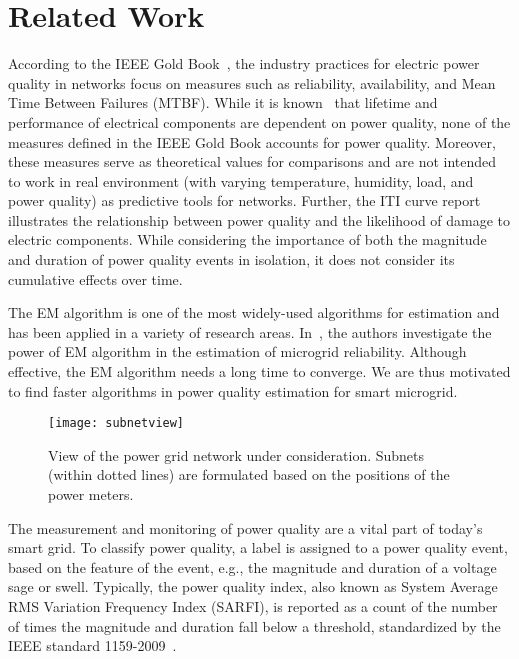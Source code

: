 \section{Related Work}
According to the IEEE Gold Book~\cite{goldbook}, the industry practices for electric power quality in networks focus on measures such as reliability, availability, and Mean Time Between Failures (MTBF). While it is known~\cite{iti_curve} that lifetime and performance of electrical components are dependent on power quality, none of the measures defined in the IEEE Gold Book accounts for power quality. Moreover, these measures serve as theoretical values for comparisons and are not intended to work in real environment (with varying temperature, humidity, load, and power quality) as predictive tools for networks. Further, the ITI curve report illustrates the relationship between power quality and the likelihood of damage to electric components. While considering the importance of both the magnitude and duration of power quality events in isolation, it does not consider its cumulative effects over time.

The EM algorithm is one of the most widely-used algorithms for estimation and has been applied in a variety of research areas.
 In~\cite{catherine_pri}, the authors investigate the power of EM algorithm in the estimation of microgrid reliability. Although effective, the EM algorithm needs a long time to converge. We are thus motivated to find faster algorithms in power quality estimation for smart microgrid.

\begin{landscape}
\begin{figure}[!p]
    \centering
    \texttt{[image: subnetview]}
    \caption{View of the power grid network under consideration. Subnets (within dotted lines) are formulated based on the positions of the power meters.}
    \label{fig:subnetview}
\end{figure}
\end{landscape}

The measurement and monitoring of power quality are a vital part of today's smart grid. To classify power quality, a label is assigned to a power quality event, based on the feature of the event, e.g., the magnitude and duration of a voltage sage or swell. Typically, the power quality index, also known as System Average RMS Variation Frequency Index (SARFI), is reported as a count of the number of times the magnitude and duration fall below a threshold, standardized by the IEEE standard 1159-2009~\cite{IEEE09_1159}.



